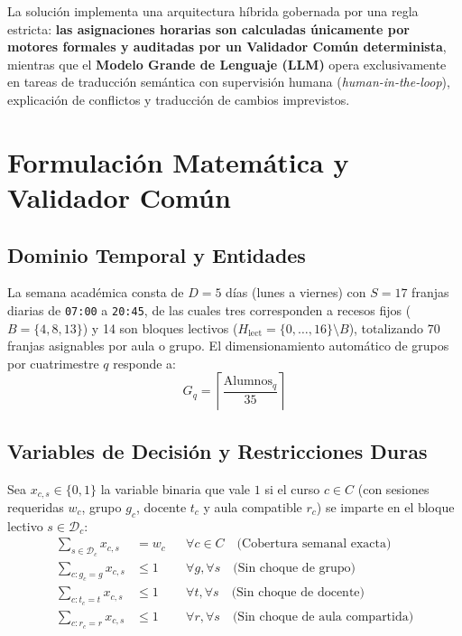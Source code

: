\documentclass[11pt,letterpaper]{article}
\newcommand{\seccionUPV}[1]{%
    \section{\texorpdfstring{\textcolor{upvmorado}{#1}}{#1}}%
    \vspace{-0.22cm}{\color{upvnaranja}\rule{\textwidth}{1.1pt}}\vspace{0.12cm}%
}
\newcommand{\subseccionUPV}[1]{%
    \subsection{\texorpdfstring{\textcolor{upvazul}{#1}}{#1}}%
}
\begin{document}
La solución implementa una arquitectura híbrida gobernada por una regla estricta: \textbf{las asignaciones horarias son calculadas únicamente por motores formales y auditadas por un Validador Común determinista}, mientras que el \textbf{Modelo Grande de Lenguaje (LLM)} opera exclusivamente en tareas de traducción semántica con supervisión humana (\textit{human-in-the-loop}), explicación de conflictos y traducción de cambios imprevistos.

\seccionUPV{Formulación Matemática y Validador Común}

\subseccionUPV{Dominio Temporal y Entidades}
La semana académica consta de $D = 5$ días (lunes a viernes) con $S = 17$ franjas diarias de \texttt{07:00} a \texttt{20:45}, de las cuales tres corresponden a recesos fijos ($B = \{4, 8, 13\}$) y 14 son bloques lectivos ($H_{\text{lect}} = \{0,\dots,16\} \setminus B$), totalizando 70 franjas asignables por aula o grupo. El dimensionamiento automático de grupos por cuatrimestre $q$ responde a:
\[
G_q = \left\lceil \frac{\text{Alumnos}_q}{35} \right\rceil
\]

\subseccionUPV{Variables de Decisión y Restricciones Duras}
Sea $x_{c,s} \in \{0,1\}$ la variable binaria que vale $1$ si el curso $c \in C$ (con sesiones requeridas $w_c$, grupo $g_c$, docente $t_c$ y aula compatible $r_c$) se imparte en el bloque lectivo $s \in \mathcal{D}_c$:
\begin{align}
\sum_{s \in \mathcal{D}_c} x_{c,s} &= w_c && \forall c \in C \quad \text{(Cobertura semanal exacta)} \\
\sum_{c : g_c = g} x_{c,s} &\leq 1 && \forall g, \forall s \quad \text{(Sin choque de grupo)} \\
\sum_{c : t_c = t} x_{c,s} &\leq 1 && \forall t, \forall s \quad \text{(Sin choque de docente)} \\
\sum_{c : r_c = r} x_{c,s} &\leq 1 && \forall r, \forall s \quad \text{(Sin choque de aula compartida)}
\end{align}
\end{document}
